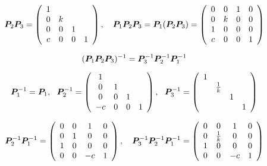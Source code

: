 \begin{jie}
$$
\boldsymbol{P}_2\boldsymbol{P}_3 =    \left(
  \begin{array}{cccc}
    1& & &  \\
    0&k& &  \\
    0&0&1& \\
    c&0&0&1
  \end{array}
\right), \quad   
\boldsymbol{P}_1\boldsymbol{P}_2\boldsymbol{P}_3=\boldsymbol{P}_1(\boldsymbol{P}_2\boldsymbol{P}_3) =\left(
  \begin{array}{cccc}
    0&0&1&0 \\
    0&k&0&0  \\
    1&0&0&0  \\
    c&0&0&1
  \end{array}
\right)
$$

$$
(\boldsymbol{P}_1\boldsymbol{P}_2\boldsymbol{P}_3)^{-1} = \boldsymbol{P}_3^{-1}\boldsymbol{P}_2^{-1}\boldsymbol{P}_1^{-1}
$$

$$
\boldsymbol{P}_1^{-1} = \boldsymbol{P}_1, ~~
\boldsymbol{P}_2^{-1} = \left(
  \begin{array}{cccc}
    1& & &  \\
    0&1& &  \\
    0&0&1& \\
    -c&0&0&1
  \end{array}
\right), ~~
\boldsymbol{P}_3^{-1} = \left(
  \begin{array}{cccc}
    1& & &  \\
     &\frac1k& &  \\
     & &1& \\
     & & &1
  \end{array}
\right)
$$    

$$
\boldsymbol{P}_2^{-1}\boldsymbol{P}_1^{-1} =   \left(
  \begin{array}{cccc}
    0&0&1&0 \\
    0&1&0&0 \\
    1&0&0&0 \\
    0&0&-c&1
  \end{array}
\right), \quad  
\boldsymbol{P}_3^{-1}\boldsymbol{P}_2^{-1}\boldsymbol{P}_1^{-1} =  \left(
  \begin{array}{cccc}
    0&0&1&0 \\
    0&\frac1k&0&0 \\
    1&0&0&0 \\
    0&0&-c&1
  \end{array}
\right)
$$
\end{jie}


